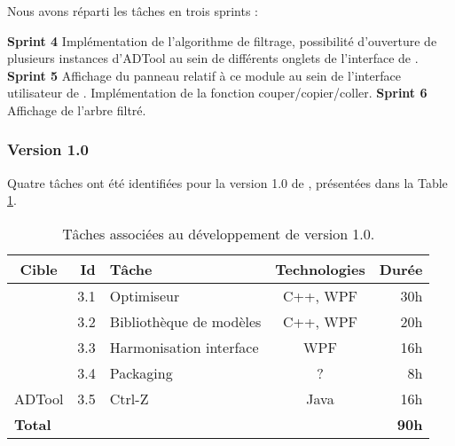             Nous avons réparti les tâches en trois sprints :

            \noindent\textbf{Sprint 4} Implémentation de l'algorithme de filtrage, possibilité d'ouverture de plusieurs instances d'ADTool au sein de différents onglets de l'interface de \glasir{}.\newline 
            \textbf{Sprint 5} Affichage du panneau relatif à ce module au sein de l'interface utilisateur de \glasir{}. Implémentation de la fonction couper/copier/coller.\newline %
            \textbf{Sprint 6} Affichage de l'arbre filtré.

        \subsubsection{Version 1.0}
            Quatre tâches ont été identifiées pour la version 1.0 de \glasir{}, présentées dans la {\sc Table} \ref{tab:taches_units_3}.
            \begin{table}[h]
                \centering
                \begin{tabular}{|c|r|l|c|r|}
                    \hline
                    \textbf{Cible} & \textbf{Id} & \textbf{Tâche} & \textbf{Technologies} & \textbf{Durée}\\
                    \hline

                    \multirow{4}{*}{\glasir{}} & 3.1 & Optimiseur & C++, WPF & 30h\\
                    \cline{2-5}
                     & 3.2 & Bibliothèque de modèles & C++, WPF & 20h\\
                    \cline{2-5}
                     & 3.3 & Harmonisation interface & WPF & 16h\\
                    \cline{2-5}
                     & 3.4 & Packaging & ? & 8h\\
                    \hline

                    \multirow{1}{*}{ADTool} & 3.5 & Ctrl-Z & \multirow{1}{*}{Java} & 16h\\
                    \hline

                    \multicolumn{4}{|l|}{\bf Total} & {\bf 90h}\\
                    \hline
                \end{tabular}
                \caption{Tâches associées au développement de \glasir{} version 1.0.}
                \label{tab:taches_units_3}
            \end{table}
            
